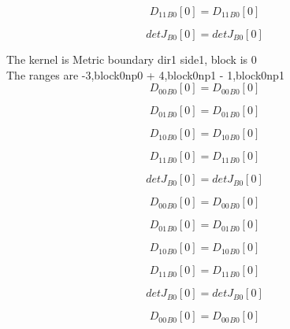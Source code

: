\documentclass{article}
\begin{document}
\begin{dmath}{D_{11}{_{B0}}}[{0}] = {D_{11}{_{B0}}}[{0}]\end{dmath}

\begin{dmath}{detJ{_{B0}}}[{0}] = {detJ{_{B0}}}[{0}]\end{dmath}

\noindent The kernel is Metric boundary dir1 side1, block is 0\\\noindent The ranges are -3,block0np0 + 4,block0np1 - 1,block0np1\\\begin{dmath}{D_{00}{_{B0}}}[{0}] = {D_{00}{_{B0}}}[{0}]\end{dmath}

\begin{dmath}{D_{01}{_{B0}}}[{0}] = {D_{01}{_{B0}}}[{0}]\end{dmath}

\begin{dmath}{D_{10}{_{B0}}}[{0}] = {D_{10}{_{B0}}}[{0}]\end{dmath}

\begin{dmath}{D_{11}{_{B0}}}[{0}] = {D_{11}{_{B0}}}[{0}]\end{dmath}

\begin{dmath}{detJ{_{B0}}}[{0}] = {detJ{_{B0}}}[{0}]\end{dmath}

\begin{dmath}{D_{00}{_{B0}}}[{0}] = {D_{00}{_{B0}}}[{0}]\end{dmath}

\begin{dmath}{D_{01}{_{B0}}}[{0}] = {D_{01}{_{B0}}}[{0}]\end{dmath}

\begin{dmath}{D_{10}{_{B0}}}[{0}] = {D_{10}{_{B0}}}[{0}]\end{dmath}

\begin{dmath}{D_{11}{_{B0}}}[{0}] = {D_{11}{_{B0}}}[{0}]\end{dmath}

\begin{dmath}{detJ{_{B0}}}[{0}] = {detJ{_{B0}}}[{0}]\end{dmath}

\begin{dmath}{D_{00}{_{B0}}}[{0}] = {D_{00}{_{B0}}}[{0}]\end{dmath}
\end{document}
